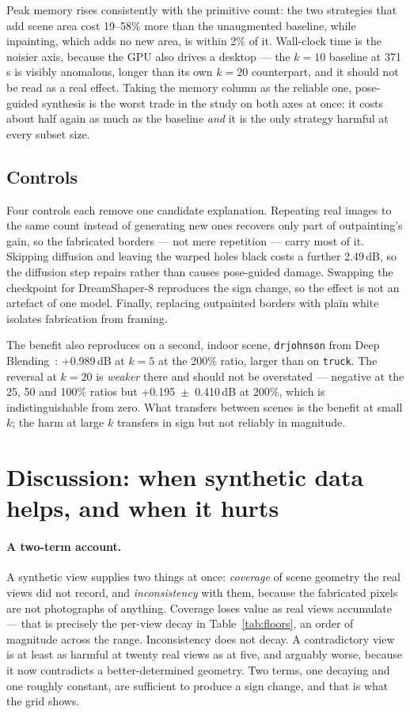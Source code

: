 \documentclass{article}
\begin{document}
Peak memory rises consistently with the primitive count: the two strategies
that add scene area cost 19--58\% more than the unaugmented baseline, while
inpainting, which adds no new area, is within 2\% of it. Wall-clock time is the
noisier axis, because the GPU also drives a desktop --- the $k = 10$ baseline at
371\,s is visibly anomalous, longer than its own $k = 20$ counterpart, and it
should not be read as a real effect. Taking the memory column as the reliable
one, pose-guided synthesis is the worst trade in the study on both axes at once:
it costs about half again as much as the baseline \emph{and} it is the only
strategy harmful at every subset size.

\subsection{Controls}

Four controls each remove one candidate explanation. Repeating real images to
the same count instead of generating new ones recovers only part of
outpainting's gain, so the fabricated borders --- not mere repetition --- carry
most of it. Skipping diffusion and leaving the warped holes black costs a
further 2.49\,dB, so the diffusion step repairs rather than causes
pose-guided damage. Swapping the checkpoint for DreamShaper-8 reproduces the
sign change, so the effect is not an artefact of one model. Finally, replacing
outpainted borders with plain white isolates fabrication from framing.

The benefit also reproduces on a second, indoor scene, \texttt{drjohnson}
from Deep Blending~\cite{hedman2018deepblending}: +0.989\,dB at $k = 5$ at the
200\% ratio, larger than on \texttt{truck}. The reversal at $k = 20$ is
\emph{weaker} there and should not be overstated --- negative at the 25, 50 and
100\% ratios but +0.195~$\pm$~0.410\,dB at 200\%, which is indistinguishable
from zero. What transfers between scenes is the benefit at small $k$; the harm at
large $k$ transfers in sign but not reliably in magnitude.

\section{Discussion: when synthetic data helps, and when it hurts}
\label{sec:discussion}

\paragraph{A two-term account.} A synthetic view supplies two things at once:
\emph{coverage} of scene geometry the real views did not record, and
\emph{inconsistency} with them, because the fabricated pixels are not
photographs of anything. Coverage loses value as real views accumulate --- that
is precisely the per-view decay in Table~\ref{tab:floors}, an order of
magnitude across the range. Inconsistency does not decay. A contradictory view
is at least as harmful at twenty real views as at five, and arguably worse,
because it now contradicts a better-determined geometry. Two terms, one
decaying and one roughly constant, are sufficient to produce a sign change, and
that is what the grid shows.
\end{document}
